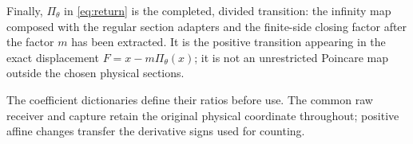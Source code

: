 Finally, \(\Pi_\theta\) in \eqref{eq:return} is the completed, divided
transition: the infinity map composed with the regular section adapters and
the finite-side closing factor after the factor \(m\) has been extracted.
It is the positive transition appearing in the exact displacement
\(F=x-m\Pi_\theta(x)\); it is not an unrestricted Poincare map outside the
chosen physical sections.

The coefficient dictionaries define their ratios before use. The common
raw receiver and capture retain the original physical coordinate throughout;
positive affine changes transfer the derivative signs used for counting.
